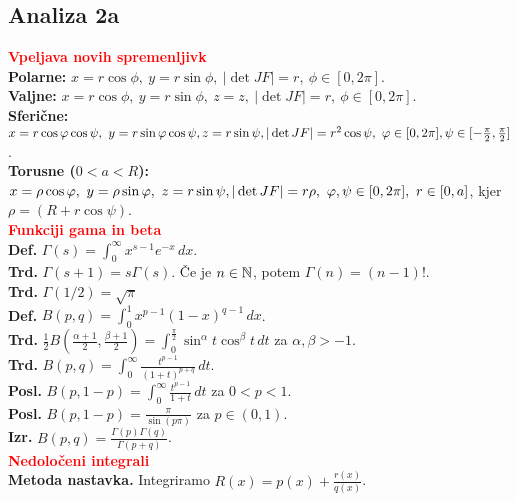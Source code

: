 \documentclass[a4paper,oneside,8pt,landscape]{extarticle}
\begin{document}
\begin{multicols*}{3}
\section{Analiza 2a}
\textbf{\textcolor{red}{Vpeljava novih spremenljivk}}\\
\textbf{Polarne:} \(x = r\cos \phi,\ y = r \sin \phi,\ |\det JF| = r,\ \phi \in [0, 2 \pi]\).\\
\textbf{Valjne:} \(x = r\cos \phi,\ y = r \sin \phi,\ z = z,\ |\det JF| = r,\ \phi \in [0, 2 \pi]\).\\
\textbf{Sferične:} \(x = r \cos \phi \cos \psi,\ y = r \sin\phi \cos\psi, z = r\sin\psi,\\ |\det JF| = r^2 \cos \psi,\ \phi \in [0, 2 \pi], \psi \in [-\frac{\pi}{2}, \frac{\pi}{2}]\).\\
\textbf{Torusne (\(0 < a < R\)):} \(x = \rho \cos \phi,\ y = \rho \sin \phi,\ z = r\sin \psi, \\ |\det JF| = r \rho,\ \phi, \psi \in [0, 2 \pi],\ r \in [0, a]\), kjer \(\rho = (R + r \cos \psi)\).\\
%
%
\textbf{\textcolor{red}{Funkciji gama in beta}}\\
\textbf{Def.} \(\Gamma (s) = \int_{0}^{\infty} x^{s-1}e^{-x} \, dx\).\\
\textbf{Trd.} \(\Gamma(s+1) = s \Gamma(s)\). Če je \(n \in \N\), potem \(\Gamma(n) = (n-1)!\).\\
\textbf{Trd.} \(\Gamma(1/2) = \sqrt{\pi}\)\\
\textbf{Def.} \(B(p,q) = \int_{0}^{1}x^{p-1}(1-x)^{q-1} \, dx\).\\
\textbf{Trd.} \(\frac{1}{2} B(\frac{\alpha + 1}{2}, \frac{\beta + 1}{2}) = \int_{0}^{\frac{\pi}{2}} \sin^\alpha t \cos^\beta t \, dt\) za \(\alpha, \beta > -1\).\\
\textbf{Trd.} \(B(p,q) = \int_{0}^{\infty} \frac{t^{p-1}}{(1+t)^{p+q}} \, dt\).\\
\textbf{Posl.} \(B(p, 1-p) = \int_{0}^{\infty} \frac{t^{p-1}}{1+t} \, dt\) za \(0<p<1\).\\
\textbf{Posl.} \(B(p, 1-p) = \frac{\pi}{\sin (p \pi)}\) za \(p \in (0, 1)\).\\
\textbf{Izr.} \(B(p, q) = \frac{\Gamma(p) \Gamma(q)}{\Gamma(p+q)}\).\\
%
%
\textbf{\textcolor{red}{Nedoločeni integrali}}\\
\textbf{Metoda nastavka.} Integriramo \(R(x) = p(x) + \frac{r(x)}{q(x)}\).\\

\end{multicols*}
\end{document}

